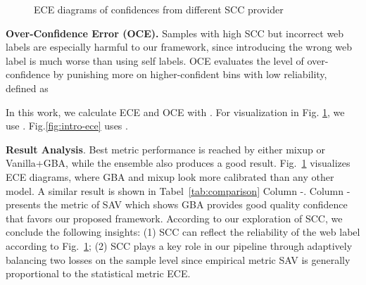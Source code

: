 \documentclass[runningheads]{llncs}
\begin{document}
\begin{figure}[t!]
    \centering
    
    \caption{ECE diagrams of confidences from different SCC provider}
	\label{fig:ece}
\end{figure}
\textbf{Over-Confidence Error (OCE).} Samples with high SCC but incorrect web labels are especially harmful to our framework, since introducing the wrong web label is much worse than using self labels. OCE evaluates the level of over-confidence by punishing more on higher-confident bins with low reliability, defined as

In this work, we calculate ECE and OCE with . For visualization in Fig. \ref{fig:ece}, we use . Fig.\ref{fig:intro-ece} uses .

\textbf{Result Analysis}.
Best metric performance is reached by either mixup or Vanilla+GBA, while the ensemble also produces a good result. Fig.~\ref{fig:ece} visualizes ECE diagrams, where GBA and mixup look more calibrated than any other model. A similar result is shown in Tabel~\ref{tab:comparison} Column -. Column - presents the metric of SAV which shows GBA provides good quality confidence that favors our proposed framework. According to our exploration of SCC, we conclude the following insights:
(1) SCC can reflect the reliability of the web label according to Fig.~\ref{fig:ece};
(2) SCC plays a key role in our pipeline through adaptively balancing two losses on the sample level since empirical metric SAV is generally proportional to the statistical metric ECE.
    
\end{document}
